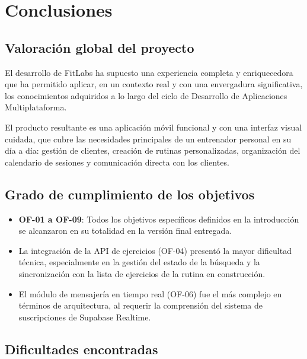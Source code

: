 \chapter{Conclusiones}

\section{Valoración global del proyecto}

El desarrollo de FitLabs ha supuesto una experiencia completa y enriquecedora que ha permitido aplicar, en un contexto real y con una envergadura significativa, los conocimientos adquiridos a lo largo del ciclo de Desarrollo de Aplicaciones Multiplataforma.

El producto resultante es una aplicación móvil funcional y con una interfaz visual cuidada, que cubre las necesidades principales de un entrenador personal en su día a día: gestión de clientes, creación de rutinas personalizadas, organización del calendario de sesiones y comunicación directa con los clientes.

\section{Grado de cumplimiento de los objetivos}

\begin{itemize}
  \item \textbf{OF-01 a OF-09}: Todos los objetivos específicos definidos en la introducción se alcanzaron en su totalidad en la versión final entregada.
  \item La integración de la API de ejercicios (OF-04) presentó la mayor dificultad técnica, especialmente en la gestión del estado de la búsqueda y la sincronización con la lista de ejercicios de la rutina en construcción.
  \item El módulo de mensajería en tiempo real (OF-06) fue el más complejo en términos de arquitectura, al requerir la comprensión del sistema de suscripciones de Supabase Realtime.
\end{itemize}

\section{Dificultades encontradas}

